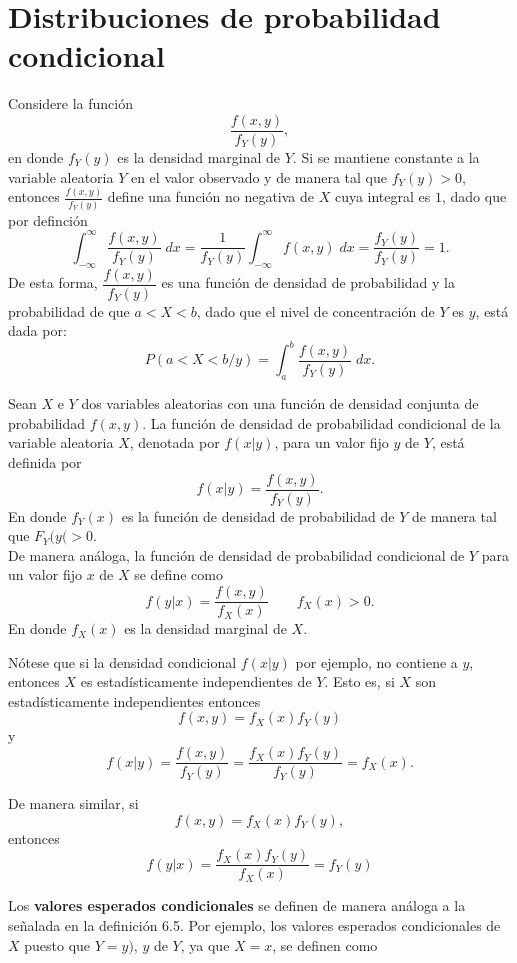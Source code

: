 \section{Distribuciones de probabilidad condicional}

Considere la función 
$$\dfrac{f(x,y)}{f_Y(y)},$$
en donde $f_Y(y)$ es la densidad marginal de $Y$. Si se mantiene constante a la variable aleatoria $Y$ en el valor observado y de manera tal que $f_Y(y)>0$, entonces $\frac{f(x,y)}{f_Y(y)}$ define una función no negativa de $X$  cuya integral es $1$, dado que por definción
$$\int_{-\infty}^{\infty}\dfrac{f(x,y)}{f_Y(y)}\; dx = \dfrac{1}{f_Y(y)}\int_{-\infty}^\infty f(x,y)\; dx = \dfrac{f_Y(y)}{f_Y(y)}=1.$$
De esta forma, $\dfrac{f(x,y)}{f_Y(y)}$ es una función de densidad de probabilidad y la probabilidad de que $a<X<b$, dado que el nivel de concentración de $Y$ es $y$, está dada por:
$$P(a<X<b/y)=\int_a^b \dfrac{f(x,y)}{f_Y(y)}\; dx.$$

\begin{tcolorbox}
    \begin{def.}
	Sean $X$ e $Y$ dos variables aleatorias con una función de densidad conjunta de probabilidad $f(x,y)$. La función de densidad de probabilidad condicional de la variable aleatoria $X$, denotada por $f(x|y)$, para un valor fijo $y$ de $Y$, está definida por
	$$f(x|y)=\dfrac{f(x,y)}{f_Y(y)}.$$
	En donde $f_Y(x)$ es la función de densidad de probabilidad de $Y$ de manera tal que $F_Y(y(>0.$\\

	De manera análoga, la función de densidad de probabilidad condicional de $Y$ para un valor fijo $x$ de $X$ se define como
	$$f(y|x)=\dfrac{f(x,y)}{f_X(x)}\qquad f_X(x)>0.$$
	En donde $f_X(x)$ es la densidad marginal de $X$. 
    \end{def.}
\end{tcolorbox}

Nótese que si la densidad condicional $f(x|y)$ por ejemplo, no contiene a $y$, entonces $X$ es estadísticamente independientes de $Y$. Esto es, si $X$ son estadísticamente independientes entonces
$$f(x,y)=f_X(x) f_Y(y)$$
y
$$f(x|y)=\dfrac{f(x,y)}{f_Y(y)}=\dfrac{f_X(x)f_Y(y)}{f_Y(y)}=f_X(x).$$

De manera similar, si 
$$f(x,y)=f_X(x)f_Y(y),$$
entonces
$$f(y|x)=\dfrac{f_X(x)f_Y(y)}{f_X(x)}=f_Y(y)$$

Los \textbf{valores esperados condicionales} se definen de manera análoga a la señalada en la definición 6.5. Por ejemplo, los valores esperados condicionales de $X$ puesto que $Y=y)$, $y$ de $Y$, ya que $X=x$, se definen como 

